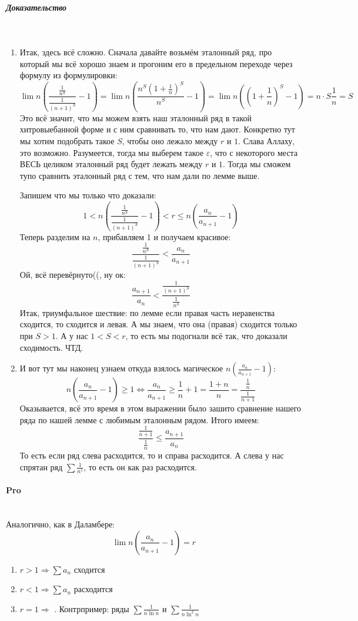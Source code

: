 \documentclass{article}
\let\vanillaparagraph\paragraph
\let\vanillasubparagraph\subparagraph
\renewcommand{\paragraph}[1]{\vanillaparagraph{#1}\mbox{}\\}
\renewcommand{\subparagraph}[1]{\vanillasubparagraph{#1}\mbox{}\\}
\begin{document}
\subparagraph{Доказательство}
\begin{enumerate}
    \item 
    Итак, здесь всё сложно. Сначала давайте возьмём эталонный ряд, про который мы всё хорошо знаем и прогоним его в предельном переходе через формулу из формулировки: 
    $$
    \lim n\left(\frac{\frac{1}{n^S}}{\frac{1}{(n+1)^S}} - 1\right) = \lim n\left(\frac{n^S(1 + \frac{1}{n})^S}{n^S} - 1\right) = \lim n\left(\left(1 + \frac{1}{n}\right)^S - 1\right) = n\cdot S \frac{1}{n} = S
    $$
    Это всё значит, что мы можем взять наш эталонный ряд в такой хитровыебанной форме и с ним сравнивать то, что нам дают. Конкретно тут мы хотим подобрать такое $S$, чтобы оно лежало между $r$ и $1$. Слава Аллаху, это возможно. Разумеется, тогда мы выберем такое $\varepsilon$, что с некоторого места ВЕСЬ целиком эталонный ряд будет лежать между $r$ и $1$. Тогда мы сможем тупо сравнить эталонный ряд с тем, что нам дали по лемме выше. 
    
    Запишем что мы только что доказали:
    $$
    1 < n\left(\frac{\frac{1}{n^S}}{\frac{1}{(n+1)^S}} - 1\right) < r \le n\left(\frac{a_n}{a_{n+1}} - 1\right)
    $$
    Теперь разделим на $n$, прибавляем 1 и получаем красивое:
    $$
    \frac{\frac{1}{n^S}}{\frac{1}{(n+1)^S}} < \frac{a_n}{a_{n+1}}
    $$
    Ой, всё перевёрнуто((, ну ок:
    $$
    \frac{a_{n+1}}{a_n} < \frac{\frac{1}{(n+1)^S}}{\frac{1}{n^S}} 
    $$
    Итак, триумфальное шествие: по лемме если правая часть неравенства сходится, то сходится и левая. А мы знаем, что она (правая) сходится только при $S > 1$. А у нас $1 < S < r$, то есть мы подогнали всё так, что доказали сходимость. ЧТД.
    
    \item
    И вот тут мы наконец узнаем откуда взялось магическое $n(\frac{a_n}{a_{n+1}} - 1)$:
    $$
    n(\frac{a_n}{a_{n+1}} - 1) \ge 1 \Leftrightarrow \frac{a_n}{a_{n+1}} \ge \frac{1}{n} + 1 = \frac{1 + n}{n} = \frac{\frac{1}{n}}{\frac{1}{n + 1}}
    $$
    Оказывается, всё это время в этом выражении было зашито сравнение нашего ряда по нашей лемме с любимым эталонным рядом. Итого имеем:
    $$
    \frac{\frac{1}{n+1}}{\frac{1}{n}} \le \frac{a_{n+1}}{a_n}
    $$
    То есть если ряд слева расходится, то и справа расходится. А слева у нас спрятан ряд $\sum \frac{1}{n^1}$, то есть он как раз расходится.
\end{enumerate}

\paragraph{Pro}
Аналогично, как в Даламбере:
$$
\lim n\left(\frac{a_n}{a_{n+1}} - 1\right) = r
$$
\begin{enumerate}
    \item $r > 1 \Rightarrow \sum a_n$ сходится
    \item $r < 1 \Rightarrow \sum a_n$ расходится
    \item $r = 1 \Rightarrow$ \Frowny. Контрпример: ряды $\sum \frac{1}{n\ln n}$ и $\sum \frac{1}{n\ln^2 n}$
\end{enumerate}
\end{document}
